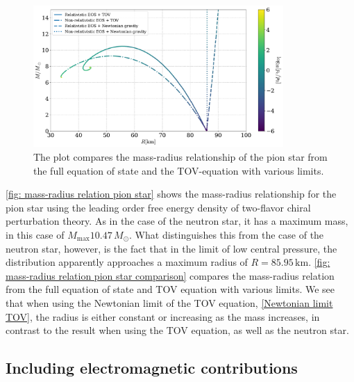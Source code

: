 \begin{figure}[!h]
    \centering
    \includegraphics[width=0.85\textwidth]{../scripts/figurer/pion_star/mass_radius_comparison.pdf}
    \caption{
        The plot compares the mass-radius relationship of the pion star from the full equation of state and the TOV-equation with various limits.
        }
        \label{fig: mass-radius relation pion star comparison}
\end{figure}


\autoref{fig: mass-radius relation pion star} shows the mass-radius relationship for the pion star using the leading order free energy density of two-flavor chiral perturbation theory.
As in the case of the neutron star, it has a maximum mass, in this case of $M_\text{max} 10.47\, M_\odot$.
What distinguishes this from the case of the neutron star, however, is the fact that in the limit of low central pressure, the distribution apparently approaches a maximum radius of $R = 85.95 \, \text{km}$.
\autoref{fig: mass-radius relation pion star comparison} compares the mass-radius relation from the full equation of state and TOV equation with various limits.
We see that  when using the Newtonian limit of the TOV equation, \autoref{Newtonian limit TOV}, the radius is either constant or increasing as the mass increases, in contrast to the result when using the TOV equation, as well as the neutron star.



\FloatBarrier
\subsection{Including electromagnetic contributions}

